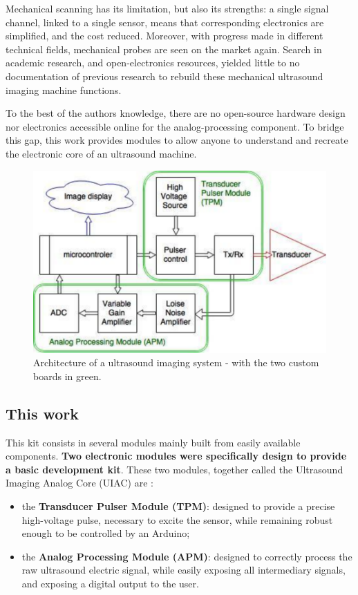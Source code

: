 \documentclass[letterpaper, 10 pt, conference]{ieeeconf} %
\begin{document}
Mechanical scanning has its limitation, but also its strengths: a single signal channel, linked to a single sensor, means that corresponding electronics are simplified, and the cost reduced. Moreover, with progress made in different technical fields, mechanical probes are seen on the market again. Search in academic research, and open-electronics resources, yielded little to no documentation of previous research to rebuild these mechanical ultrasound imaging machine functions.

To the best of the authors knowledge, there are no open-source hardware design nor electronics accessible online for the analog-processing component. To bridge this gap, this work provides modules to allow anyone to understand and recreate the electronic core of an ultrasound machine. 

\begin{figure}%
\centering
\includegraphics[width=.8\linewidth]{fullprinciples.pdf}
\caption{Architecture of a ultrasound imaging system - with the two custom boards in green.}
\end{figure}

\subsection{This work}

This kit consists in several modules mainly built from easily available components. \textbf{Two electronic modules were specifically design to provide a basic development kit}. These two modules, together called the Ultrasound Imaging Analog Core (UIAC) are :

\begin{itemize}
\item the \textbf{Transducer Pulser Module (TPM)}: designed to provide a precise high-voltage pulse, necessary to excite the sensor, while remaining robust enough to be controlled by an Arduino;  
\item the \textbf{Analog Processing Module (APM)}: designed to correctly process the raw ultrasound electric signal, while easily exposing all intermediary signals, and exposing a digital output to the user. 
\end{itemize}
\end{document}
